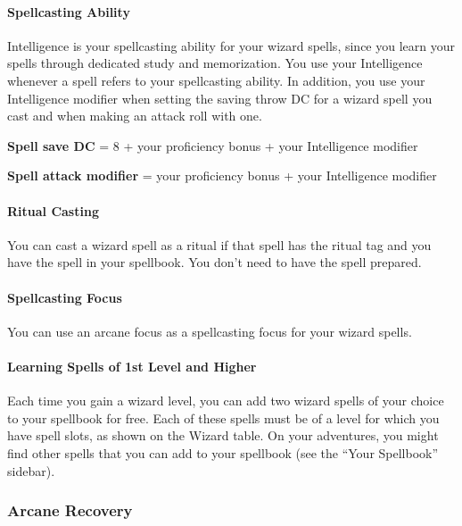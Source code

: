 \documentclass[
]{article}
\begin{document}
\hypertarget{spellcasting-ability}{%
\paragraph{Spellcasting Ability}\label{spellcasting-ability}}

Intelligence is your spellcasting ability for your wizard spells, since
you learn your spells through dedicated study and memorization. You use
your Intelligence whenever a spell refers to your spellcasting ability.
In addition, you use your Intelligence modifier when setting the saving
throw DC for a wizard spell you cast and when making an attack roll with
one.

\textbf{Spell save DC} = 8 + your proficiency bonus + your Intelligence
modifier

\textbf{Spell attack modifier} = your proficiency bonus + your
Intelligence modifier

\hypertarget{ritual-casting}{%
\paragraph{Ritual Casting}\label{ritual-casting}}

You can cast a wizard spell as a ritual if that spell has the ritual tag
and you have the spell in your spellbook. You don't need to have the
spell prepared.

\hypertarget{spellcasting-focus}{%
\paragraph{Spellcasting Focus}\label{spellcasting-focus}}

You can use an arcane focus as a spellcasting focus for your wizard
spells.

\hypertarget{learning-spells-of-1st-level-and-higher}{%
\paragraph{Learning Spells of 1st Level and
Higher}\label{learning-spells-of-1st-level-and-higher}}

Each time you gain a wizard level, you can add two wizard spells of your
choice to your spellbook for free. Each of these spells must be of a
level for which you have spell slots, as shown on the Wizard table. On
your adventures, you might find other spells that you can add to your
spellbook (see the ``Your Spellbook'' sidebar).

\hypertarget{arcane-recovery}{%
\subsubsection{Arcane Recovery}\label{arcane-recovery}}
\end{document}
